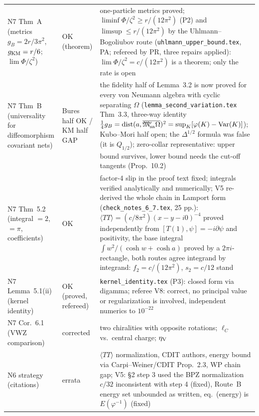 \begin{small}
\begin{tabular}{p{}p{}p{}}
N7 Thm~A (metrics $g_B=2r/3\pi^2$, $g_{\rm KM}=r/6$; $\lim\Phi/\zeta^2$) & OK (theorem) & one-particle metrics proved; $\liminf\Phi/\zeta^2\ge r/(12\pi^2)$ (P2) and $\limsup\le r/(12\pi^2)$ by the Uhlmann--Bogoliubov route (\texttt{uhlmann\_upper\_bound.tex}, PA; refereed by PR, three repairs applied): $\lim\Phi/\zeta^2=c/(12\pi^2)$ is a theorem; only the rate is open \\
N7 Thm~B (universality for diffeomorphism covariant nets) & Bures half OK / KM half GAP & the fidelity half of Lemma~3.2 is now proved for every von Neumann algebra with cyclic separating $\Omega$ (\texttt{lemma\_second\_variation.tex} Thm~3.3, three-way identity $\tfrac14g_B=\operatorname{dist}(a,\overline{\mathfrak M'_{\rm sa}\Omega})^2=\sup_K[\varphi(K)-\operatorname{Var}(K)]$); Kubo--Mori half open; the $\Delta^{1/2}$ formula was false (it is $Q_{1/2}$); zero-collar representative: upper bound survives, lower bound needs the cut-off tangents (Prop.~10.2) \\
N7 Thm~5.2 (integral $=2$, $=\pi$, coefficients) & OK & factor-4 slip in the proof text fixed; integrals verified analytically and numerically; V5 re-derived the whole chain in Lamport form (\texttt{check\_notes\_6\_7.tex}, 25 pp.): $\langle TT\rangle=(c/8\pi^2)(x-y-i0)^{-4}$ proved independently from $[T(1),\psi]=-i\partial\psi$ and positivity, the base integral $\int w^2/(\cosh w+\cosh a)$ proved by a $2\pi i$-rectangle, both routes agree integrand by integrand: $f_2=c/(12\pi^2)$, $s_2=c/12$ stand \\
N7 Lemma~5.1(ii) (kernel identity) & OK (proved, refereed) & \texttt{kernel\_identity.tex} (P3): closed form via digamma; referee V8: correct, no principal value or regularization is involved, independent numerics to $10^{-22}$ \\
N7 Cor.~6.1 (VWZ comparison) & corrected & two chiralities with opposite rotations; $\ell_C$ vs.\ central charge; $\eta_{\rm V}$ \\
N6 strategy (citations) & errata & $\langle TT\rangle$ normalization, CDIT authors, energy bound via Carpi--Weiner/CDIT Prop.~2.3, WP chain gap; V5: \S2 step 3 used the BPZ normalization $c/32$ inconsistent with step 4 (fixed), Route~B energy set unbounded as written, eq.~(energy) is $E(\varphi^{-1})$ (fixed) \\
\hline
\end{tabular}
\end{small}

